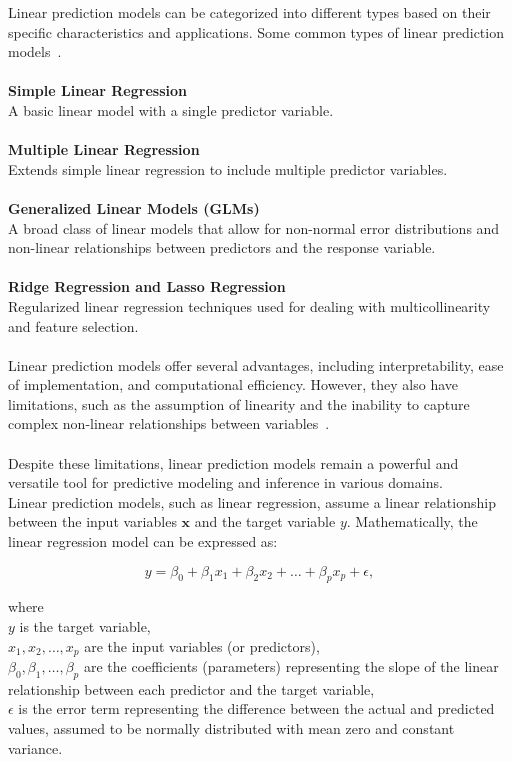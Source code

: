 \documentclass[12pt]{article}
\begin{document}
\noindent Linear prediction models can be categorized into different types based on their
specific characteristics and applications. Some common types of linear prediction models~\cite{WOS:000788587300109, WOS:000426617000001}.\\
\\
\textbf{Simple Linear Regression}\\
A basic linear model with a single predictor variable.\\
\\
\textbf{Multiple Linear Regression}\\
Extends simple linear regression to include multiple predictor variables.\\
\\
\textbf{Generalized Linear Models (GLMs)}\\
A broad class of linear models that allow for non-normal error distributions
and non-linear relationships between predictors and the response variable.\\
\\
\textbf{Ridge Regression and Lasso Regression}\\
Regularized linear regression techniques used for dealing with multicollinearity and
feature selection.\\
\\
Linear prediction models offer several advantages, including interpretability, ease of
implementation, and computational efficiency. However, they also have limitations, such
as the assumption of linearity and the inability to capture complex non-linear
relationships between variables~\cite{WOS:000836807400001}.\\
\\
Despite these limitations, linear prediction models remain a powerful and versatile tool
for predictive modeling and inference in various domains.\\
Linear prediction models, such as linear regression, assume a linear relationship
between the input variables $\mathbf{x}$ and the target variable $y$. Mathematically,
the linear regression model can be expressed as:

\begin{equation}\label{eq2}
    y = \beta_0 + \beta_1 x_1 + \beta_2 x_2 + \ldots + \beta_p x_p + \epsilon,
\end{equation}

\noindent where\\
$y$ is the target variable,\\
$x_1, x_2, \ldots, x_p$ are the input variables (or predictors),\\
$\beta_0, \beta_1, \ldots, \beta_p$ are the coefficients (parameters) representing the slope of the linear relationship between each predictor and the target variable,\\
$\epsilon$ is the error term representing the difference between the actual and predicted values, assumed to be normally distributed with mean zero and constant variance.\\
\end{document}

